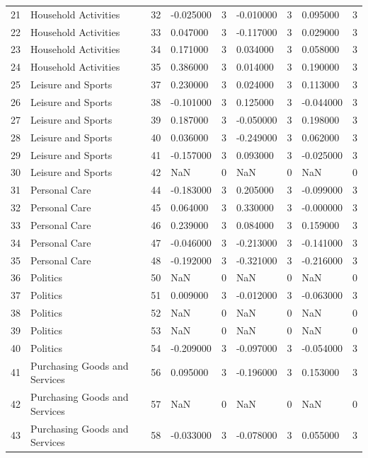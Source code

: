 \begin{tabular}{lllllllll}
21 & Household Activities & 32 & -0.025000 & 3 & -0.010000 & 3 & 0.095000 & 3 \\
22 & Household Activities & 33 & 0.047000 & 3 & -0.117000 & 3 & 0.029000 & 3 \\
23 & Household Activities & 34 & 0.171000 & 3 & 0.034000 & 3 & 0.058000 & 3 \\
24 & Household Activities & 35 & 0.386000 & 3 & 0.014000 & 3 & 0.190000 & 3 \\
25 & Leisure and Sports & 37 & 0.230000 & 3 & 0.024000 & 3 & 0.113000 & 3 \\
26 & Leisure and Sports & 38 & -0.101000 & 3 & 0.125000 & 3 & -0.044000 & 3 \\
27 & Leisure and Sports & 39 & 0.187000 & 3 & -0.050000 & 3 & 0.198000 & 3 \\
28 & Leisure and Sports & 40 & 0.036000 & 3 & -0.249000 & 3 & 0.062000 & 3 \\
29 & Leisure and Sports & 41 & -0.157000 & 3 & 0.093000 & 3 & -0.025000 & 3 \\
30 & Leisure and Sports & 42 & NaN & 0 & NaN & 0 & NaN & 0 \\
31 & Personal Care & 44 & -0.183000 & 3 & 0.205000 & 3 & -0.099000 & 3 \\
32 & Personal Care & 45 & 0.064000 & 3 & 0.330000 & 3 & -0.000000 & 3 \\
33 & Personal Care & 46 & 0.239000 & 3 & 0.084000 & 3 & 0.159000 & 3 \\
34 & Personal Care & 47 & -0.046000 & 3 & -0.213000 & 3 & -0.141000 & 3 \\
35 & Personal Care & 48 & -0.192000 & 3 & -0.321000 & 3 & -0.216000 & 3 \\
36 & Politics & 50 & NaN & 0 & NaN & 0 & NaN & 0 \\
37 & Politics & 51 & 0.009000 & 3 & -0.012000 & 3 & -0.063000 & 3 \\
38 & Politics & 52 & NaN & 0 & NaN & 0 & NaN & 0 \\
39 & Politics & 53 & NaN & 0 & NaN & 0 & NaN & 0 \\
40 & Politics & 54 & -0.209000 & 3 & -0.097000 & 3 & -0.054000 & 3 \\
41 & Purchasing Goods and Services & 56 & 0.095000 & 3 & -0.196000 & 3 & 0.153000 & 3 \\
42 & Purchasing Goods and Services & 57 & NaN & 0 & NaN & 0 & NaN & 0 \\
43 & Purchasing Goods and Services & 58 & -0.033000 & 3 & -0.078000 & 3 & 0.055000 & 3 \\

\end{tabular}
